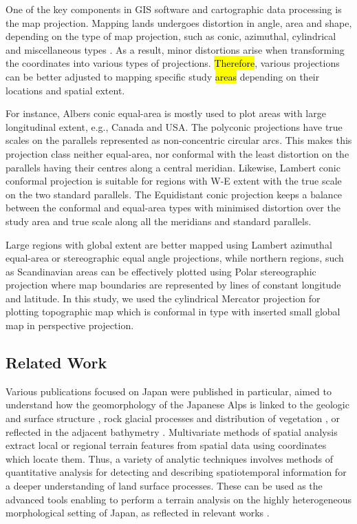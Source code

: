 \documentclass[land,article,submit,pdftex,moreauthors]{Definitions/mdpi}
\begin{document}
One of the key components in GIS software and cartographic data processing is the map projection. Mapping lands undergoes distortion in angle, area and shape, depending on the type of map projection, such as conic, azimuthal, cylindrical and miscellaneous types \cite{Ghaderpour}. As a result, minor distortions arise when transforming the coordinates into various types of projections. \hl{Therefore}, various projections can be better adjusted to mapping specific study \hl{areas }depending on their locations and spatial extent. 

For instance, Albers conic equal-area is mostly used to plot areas with large longitudinal extent, e.g., Canada and USA. The polyconic projections have true scales on the parallels represented as non-concentric circular arcs. This makes this projection class neither equal-area, nor conformal with the least distortion on the parallels having their centres along a central meridian. Likewise, Lambert conic conformal projection is suitable for regions with W-E extent with the true scale on the two standard parallels. The Equidistant conic projection keeps a balance between the conformal and equal-area types with minimised distortion over the study area and true scale along all the meridians and standard parallels. 

Large regions with global extent are better mapped using Lambert azimuthal equal-area or stereographic equal angle projections, while northern regions, such as Scandinavian areas can be effectively plotted using Polar stereographic projection where map boundaries are represented by lines of constant longitude and latitude. In this study, we used the cylindrical Mercator projection for plotting topographic map which is conformal in type with inserted small global map in perspective projection.

\subsection{Related Work}

Various publications focused on Japan were published in particular, aimed to understand how the geomorphology of the Japanese Alps is linked to the geologic and surface structure \cite{MATSUOKA201965}, rock glacial processes and distribution of vegetation \cite{FUJINO2023100146}, or reflected in the adjacent bathymetry \cite{Kariya2002}. Multivariate methods of spatial analysis extract local or regional terrain features from spatial data using coordinates which locate them. Thus, a variety of analytic techniques involves methods of quantitative analysis for detecting and describing spatiotemporal information for a deeper understanding of land surface processes. These can be used as the advanced tools enabling to perform a terrain analysis on the highly heterogeneous morphological setting of Japan, as reflected in relevant works \cite{Oguchi2000,OGUCHI2020106805,MATSUURA2015133,NIWA2021107835,HATTANJI2021107943}. 
\end{document}
